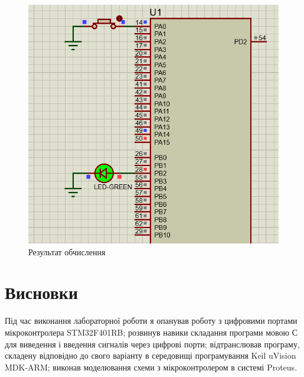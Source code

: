 \documentclass{article}
\begin{document}
\begin{normalsize}
\begin{figure}[H]
	\centering
	\includegraphics[scale=0.7]{1}
	\caption{Результат обчислення}
\end{figure}

			
		\section*{Висновки}
		Під час виконання лабораторної роботи я опанував роботу з цифровими портами мікроконтролера STM32F401RB; розвинув навики складання програми мовою С для виведення і введення сигналів через цифрові порти; відтранслював програму, складену відповідно до свого варіанту в середовищі програмування Keil uVision MDK-ARM; виконав моделювання схеми з мікроконтролером в системі Proteus.
		
	\end{normalsize}
\end{document}
